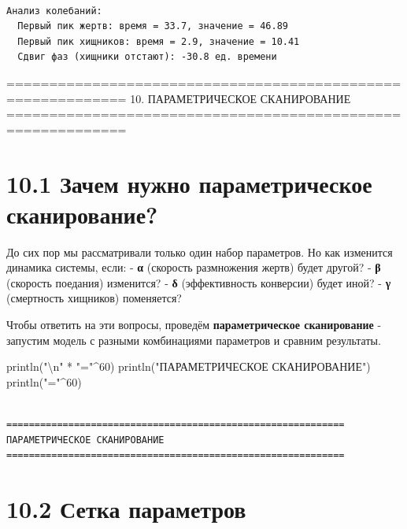 \documentclass[
  12pt,
  a4paper,
  DIV=11,
  numbers=noendperiod]{scrreprt}
\newenvironment{Shaded}{\begin{snugshade}}{\end{snugshade}}
\newcommand{\FloatTok}[1]{\textcolor[rgb]{0.68,0.00,0.00}{#1}}
\newcommand{\FunctionTok}[1]{\textcolor[rgb]{0.28,0.35,0.67}{#1}}
\newcommand{\NormalTok}[1]{\textcolor[rgb]{0.00,0.23,0.31}{#1}}
\newcommand{\OperatorTok}[1]{\textcolor[rgb]{0.37,0.37,0.37}{#1}}
\newcommand{\SpecialCharTok}[1]{\textcolor[rgb]{0.37,0.37,0.37}{#1}}
\newcommand{\StringTok}[1]{\textcolor[rgb]{0.13,0.47,0.30}{#1}}
\begin{document}
\begin{verbatim}

Анализ колебаний:
  Первый пик жертв: время = 33.7, значение = 46.89
  Первый пик хищников: время = 2.9, значение = 10.41
  Сдвиг фаз (хищники отстают): -30.8 ед. времени
\end{verbatim}

============================================================ 10.
ПАРАМЕТРИЧЕСКОЕ СКАНИРОВАНИЕ
============================================================

\section{10.1 Зачем нужно параметрическое
сканирование?}\label{ux437ux430ux447ux435ux43c-ux43dux443ux436ux43dux43e-ux43fux430ux440ux430ux43cux435ux442ux440ux438ux447ux435ux441ux43aux43eux435-ux441ux43aux430ux43dux438ux440ux43eux432ux430ux43dux438ux435-1}

До сих пор мы рассматривали только один набор параметров. Но как
изменится динамика системы, если: - \textbf{α} (скорость размножения
жертв) будет другой? - \textbf{β} (скорость поедания) изменится? -
\textbf{δ} (эффективность конверсии) будет иной? - \textbf{γ}
(смертность хищников) поменяется?

Чтобы ответить на эти вопросы, проведём \textbf{параметрическое
сканирование} - запустим модель с разными комбинациями параметров и
сравним результаты.

\begin{Shaded}
\begin{Highlighting}[]
\FunctionTok{println}\NormalTok{(}\StringTok{"}\SpecialCharTok{\textbackslash{}n}\StringTok{"} \OperatorTok{*} \StringTok{"="}\OperatorTok{\^{}}\FloatTok{60}\NormalTok{)}
\FunctionTok{println}\NormalTok{(}\StringTok{"ПАРАМЕТРИЧЕСКОЕ СКАНИРОВАНИЕ"}\NormalTok{)}
\FunctionTok{println}\NormalTok{(}\StringTok{"="}\OperatorTok{\^{}}\FloatTok{60}\NormalTok{)}
\end{Highlighting}
\end{Shaded}

\begin{verbatim}

============================================================
ПАРАМЕТРИЧЕСКОЕ СКАНИРОВАНИЕ
============================================================
\end{verbatim}

\section{10.2 Сетка
параметров}\label{ux441ux435ux442ux43aux430-ux43fux430ux440ux430ux43cux435ux442ux440ux43eux432-1}
\end{document}
